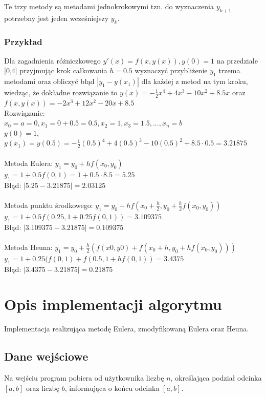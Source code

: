 \documentclass[12pt]{article}
\begin{document}
\begin{enumerate}
Te trzy metody są metodami jednokrokowymi tzn. do wyznaczenia $y_{k+1}$ potrzebny jest jeden wcześniejszy $y_k$.
\end{enumerate}


\subsubsection{Przykład}

Dla zagadnienia różniczkowego $y'(x)= f(x,y(x)), y(0)=1$
na przedziale [0,4] przyjmując krok całkowania $h = 0.5$ wyznaczyć przybliżenie $y_1$ trzema metodami oraz obliczyć błąd  $|y_1-y(x_1)|$ dla każdej z metod na tym kroku, wiedząc, że dokładne rozwiązanie to $y(x)=-\frac{1}{2}x^4+4x^3-10x^2+8.5x$ oraz  $f(x,y(x))=-2x^3+12x^2-20x+8.5 $
\\
Rozwiązanie:
\\$x_0=a=0, x_1=0+0.5=0.5, x_2=1, x_3=1.5,...,x_n=b $
\\
$y(0)=1, $
$y(x_1)=y(0.5)=-\frac{1}{2}(0.5)^4+4(0.5)^3-10(0.5)^2+8.5\cdot0.5=3.21875$
\\
\\Metoda Eulera:
$y_1=y_0+hf(x_0,y_0)$
\\
$y_1=1+0.5f(0,1)=1+0.5 \cdot 8.5 =5.25$
\\
Błąd: 
$|5.25-3.21875|=2.03125$
\\ \\Metoda punktu środkowego:
$y_1=y_0+hf(x_0+\frac{h}{2},y_0+\frac{h}{2}f(x_0,y_0))$
\\
$y_1=1+0.5f(0.25,1+0.25f(0,1))=3.109375$
\\
Błąd: 
$|3.109375-3.21875|=0.109375$
\\ \\Metoda Heuna:
$y_1=y_0 +\frac{h}{2}(f(x0,y0 )+f(x_0+h,y_0+hf(x_0,y_0)))$
\\
$y_1=1+0.25(f(0,1)+f(0.5,1+hf(0,1))=3.4375$
\\
Błąd: 
$|3.4375-3.21875|=0.21875$
\section{Opis implementacji algorytmu}
Implementacja realizująca metodę Eulera, zmodyfikowaną Eulera oraz Heuna.
\subsection{Dane wejściowe}
Na wejściu program pobiera od użytkownika liczbę $n$, określająca podział odcinka $[a, b]$ oraz liczbę $b$, informująca o końcu odcinka $[a, b]$.
\end{document}
